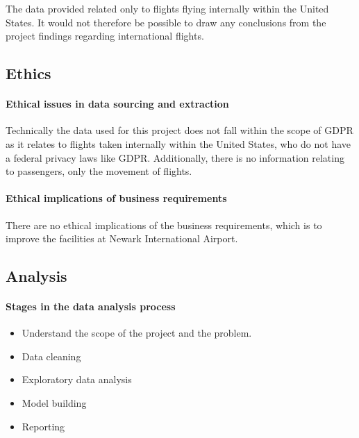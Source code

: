\documentclass[
]{article}
\providecommand{\tightlist}{%
  \setlength{\itemsep}{0pt}\setlength{\parskip}{0pt}}
\begin{document}
The data provided related only to flights flying internally within the
United States. It would not therefore be possible to draw any
conclusions from the project findings regarding international flights.

\hypertarget{ethics}{%
\subsection{Ethics}\label{ethics}}

\hypertarget{ethical-issues-in-data-sourcing-and-extraction}{%
\paragraph{Ethical issues in data sourcing and
extraction}\label{ethical-issues-in-data-sourcing-and-extraction}}

Technically the data used for this project does not fall within the
scope of GDPR as it relates to flights taken internally within the
United States, who do not have a federal privacy laws like GDPR.
Additionally, there is no information relating to passengers, only the
movement of flights.

\hypertarget{ethical-implications-of-business-requirements}{%
\paragraph{Ethical implications of business
requirements}\label{ethical-implications-of-business-requirements}}

There are no ethical implications of the business requirements, which is
to improve the facilities at Newark International Airport.

\hypertarget{analysis}{%
\subsection{Analysis}\label{analysis}}

\hypertarget{stages-in-the-data-analysis-process}{%
\paragraph{Stages in the data analysis
process}\label{stages-in-the-data-analysis-process}}

\begin{itemize}
\tightlist
\item
  Understand the scope of the project and the problem.
\item
  Data cleaning
\item
  Exploratory data analysis
\item
  Model building
\item
  Reporting
\end{itemize}
\end{document}
